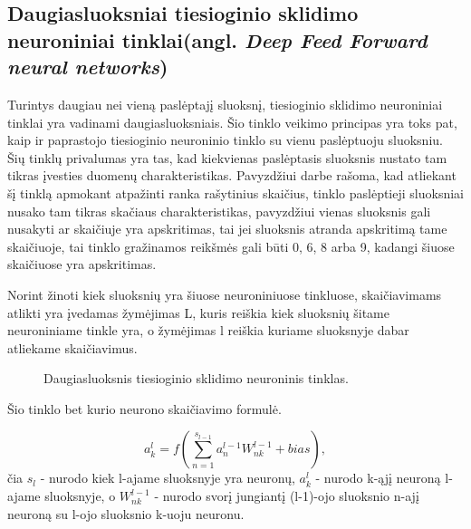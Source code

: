 \subsection{Daugiasluoksniai tiesioginio sklidimo neuroniniai tinklai(angl. \textit{Deep Feed Forward neural networks})}

Turintys daugiau nei vieną paslėptajį sluoksnį, tiesioginio sklidimo neuroniniai tinklai yra vadinami daugiasluoksniais. Šio tinklo veikimo principas yra toks pat, kaip ir paprastojo tiesioginio neuroninio tinklo su vienu paslėptuoju sluoksniu. Šių tinklų privalumas yra tas, kad kiekvienas paslėptasis sluoksnis nustato tam tikras įvesties duomenų charakteristikas. Pavyzdžiui \cite{Deividas2018} darbe rašoma, kad atliekant šį tinklą apmokant atpažinti ranka rašytinius skaičius, tinklo paslėptieji sluoksniai nusako tam tikras skačiaus charakteristikas, pavyzdžiui vienas sluoksnis gali nusakyti ar skaičiuje yra apskritimas, tai jei sluoksnis atranda apskritimą tame skaičiuoje, tai tinklo gražinamos reikšmės gali būti 0, 6, 8 arba 9, kadangi šiuose skaičiuose yra apskritimas.

Norint žinoti kiek sluoksnių yra šiuose neuroniniuose tinkluose, skaičiavimams atlikti yra įvedamas žymėjimas L, kuris reiškia kiek sluoksnių šitame neuroniniame tinkle yra, o žymėjimas l reiškia kuriame sluoksnyje dabar atliekame skaičiavimus.

\begin{figure}[h!]
  \centering
{}
\caption{Daugiasluoksnis tiesioginio sklidimo neuroninis tinklas.}
\label{fig:deepnn}
\end{figure}

Šio tinklo bet kurio neurono skaičiavimo formulė.

\begin{equation*}
  a_k^l = f(\sum_{n=1}^{s_{l-1}} a_n^{l-1}W_{nk}^{l-1} + bias),
\end{equation*}
čia $s_l$ - nurodo kiek l-ajame sluoksnyje yra neuronų, $a_k^l$ - nurodo k-ąjį neuroną l-ajame sluoksnyje, o $W_{nk}^{l-1}$ - nurodo svorį jungiantį (l-1)-ojo sluoksnio n-ajį neuroną su l-ojo sluoksnio k-uoju neuronu.


